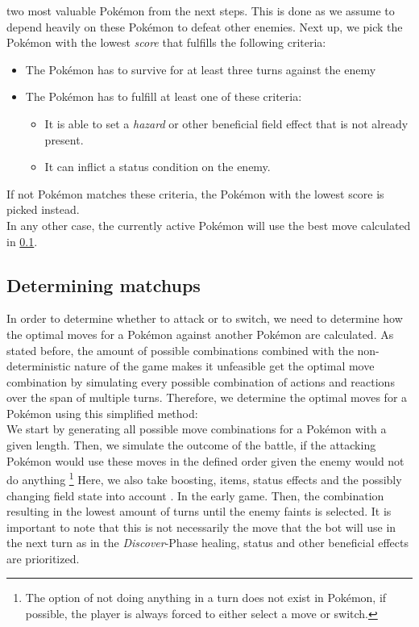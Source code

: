 two most valuable Pokémon from the next steps. This is done as we assume to depend heavily on these Pokémon to defeat
other enemies. Next up, we pick the Pokémon with the lowest \textit{score} that fulfills the following 
criteria:
\begin{itemize}
	\item The Pokémon has to survive for at least three turns against the enemy
	\item The Pokémon has to fulfill at least one of these criteria:
	\begin{itemize}
		\item It is able to set a \textit{hazard} or other beneficial field effect that is not already present.
		\item It can inflict a status condition on the enemy.
	\end{itemize}
\end{itemize}
If not Pokémon matches these criteria, the Pokémon with the lowest score is picked instead. \\
In any other case, the currently active Pokémon will use the best move calculated in \ref{sec:determine-matchups}.
\subsection{Determining matchups}
\label{sec:determine-matchups}
In order to determine whether to attack or to switch, we need to determine how the optimal moves for a Pokémon against
another Pokémon are calculated. As stated before, the amount of possible combinations combined with the non-deterministic
nature of the game makes it unfeasible get the optimal move combination by simulating every possible combination of 
actions and reactions over the span of multiple turns. Therefore, we determine the optimal moves for a Pokémon using 
this simplified method: \\
We start by generating all possible move combinations for a Pokémon with a given length. Then, we simulate the outcome
of the battle, if the attacking Pokémon would use these moves in the defined order given the enemy would not do anything
\footnote{The option of not doing anything in a turn does not exist in Pokémon, if possible, the player is always 
forced to either select a move or switch.} Here, we also take boosting, items, status effects and the possibly changing
field state into account .
In the early game. Then, the combination resulting in the lowest amount of turns until the enemy faints is selected. 
It is important to note that this is not necessarily the move that the bot will use in the next turn as in the 
\textit{Discover}-Phase healing, status and other beneficial effects are prioritized.